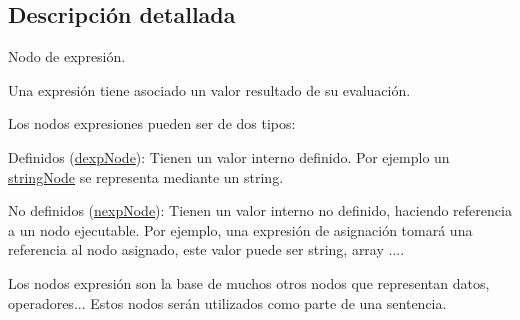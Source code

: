 \subsection{Descripción detallada}
Nodo de expresión. 

Una expresión tiene asociado un valor resultado de su evaluación.

Los nodos expresiones pueden ser de dos tipos\-:


\begin{DoxyItemize}
\item Definidos (\hyperlink{classdexpNode}{dexp\-Node})\-: Tienen un valor interno definido. Por ejemplo un \hyperlink{classstringNode}{string\-Node} se representa mediante un string.
\item No definidos (\hyperlink{classnexpNode}{nexp\-Node})\-: Tienen un valor interno no definido, haciendo referencia a un nodo ejecutable. Por ejemplo, una expresión de asignación tomará una referencia al nodo asignado, este valor puede ser string, array ....
\end{DoxyItemize}

Los nodos expresión son la base de muchos otros nodos que representan datos, operadores... Estos nodos serán utilizados como parte de una sentencia. 

